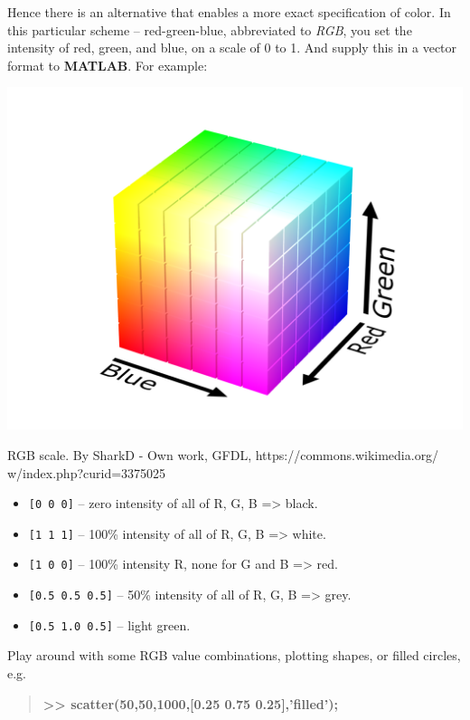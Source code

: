 \documentclass{tufte-book} %
\newenvironment{docspecbold}{\begin{quotation}\ttfamily\bfseries\parskip0pt\parindent0pt\ignorespaces}{\end{quotation}}
\begin{document}
Hence there is an alternative that enables a more exact specification of color. In this particular scheme -- red-green-blue, abbreviated to \textit{RGB}, you set the intensity of red, green, and blue, on a scale of 0 to 1. And supply this in a vector format to \textbf{MATLAB}. For example:

\begin{marginfigure}[-0.0in]
\includegraphics[width=\linewidth]{RGB_color_solid_cube.png}
\caption{RGB scale. By SharkD - Own work, GFDL, https://commons.wikimedia.org/
w/index.php?curid=3375025}
\label{fig:RGB_color_solid_cube}
\end{marginfigure}

\begin{itemize}[noitemsep]
\setlength{\itemindent}{.2in}
\item \texttt{[0 0 0]} -- zero intensity of all of R, G, B => black.
\item \texttt{[1 1 1]} -- 100\% intensity of all of R, G, B => white.
\item \texttt{[1 0 0]} -- 100\% intensity R, none for G and B => red.
\item \texttt{[0.5 0.5 0.5]} -- 50\% intensity of all of R, G, B => grey.
\item \texttt{[0.5 1.0 0.5]} -- light green.
\end{itemize}

Play around with some RGB value combinations, plotting shapes, or filled circles, e.g.
\begin{docspecbold}
>> scatter(50,50,1000,[0.25 0.75 0.25],'filled');
\end{docspecbold}
\end{document}
